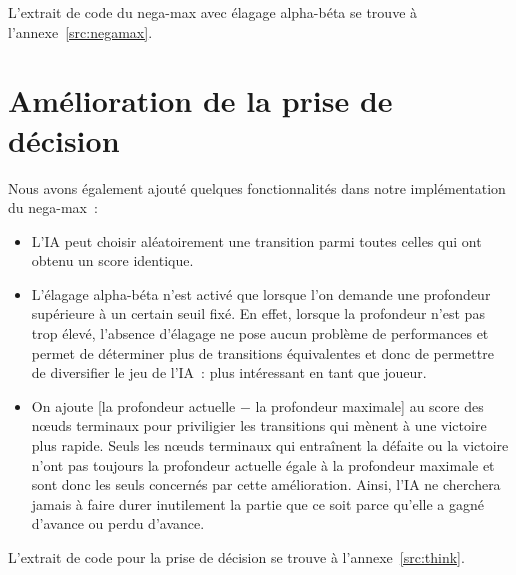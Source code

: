 L'extrait de code du nega-max avec élagage alpha-béta se trouve à l'annexe \ref{src:negamax}.

\section{Amélioration de la prise de décision}

Nous avons également ajouté quelques fonctionnalités dans notre implémentation du nega-max :

\begin{itemize}
    \item L'IA peut choisir aléatoirement une transition parmi toutes celles qui ont obtenu un score identique.
    \item L'élagage alpha-béta n'est activé que lorsque l'on demande une profondeur supérieure à un certain seuil fixé.
        En effet, lorsque la profondeur n'est pas trop élevé, l'absence d'élagage ne pose aucun problème de performances et
        permet de déterminer plus de transitions équivalentes et donc de permettre de diversifier le jeu de l'IA : plus
        intéressant en tant que joueur.
    \item On ajoute [la profondeur actuelle \(-\) la profondeur maximale] au score des nœuds terminaux pour priviligier les
        transitions qui mènent à une victoire plus rapide. Seuls les nœuds terminaux qui entraînent la défaite ou la victoire
        n'ont pas toujours la profondeur actuelle égale à la profondeur maximale et sont donc les seuls concernés par cette
        amélioration. Ainsi, l'IA ne cherchera jamais à faire durer inutilement la partie que ce soit parce qu'elle a gagné
        d'avance ou perdu d'avance.
\end{itemize}

L'extrait de code pour la prise de décision se trouve à l'annexe \ref{src:think}.

